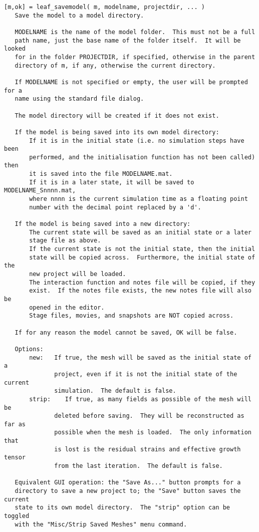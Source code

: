 \begin{verbatim}
[m,ok] = leaf_savemodel( m, modelname, projectdir, ... )
   Save the model to a model directory.

   MODELNAME is the name of the model folder.  This must not be a full
   path name, just the base name of the folder itself.  It will be looked
   for in the folder PROJECTDIR, if specified, otherwise in the parent
   directory of m, if any, otherwise the current directory.

   If MODELNAME is not specified or empty, the user will be prompted for a
   name using the standard file dialog.  

   The model directory will be created if it does not exist.

   If the model is being saved into its own model directory:
       If it is in the initial state (i.e. no simulation steps have been
       performed, and the initialisation function has not been called) then
       it is saved into the file MODELNAME.mat.
       If it is in a later state, it will be saved to MODELNAME_Snnnn.mat,
       where nnnn is the current simulation time as a floating point
       number with the decimal point replaced by a 'd'.

   If the model is being saved into a new directory:
       The current state will be saved as an initial state or a later
       stage file as above.
       If the current state is not the initial state, then the initial
       state will be copied across.  Furthermore, the initial state of the
       new project will be loaded.
       The interaction function and notes file will be copied, if they
       exist.  If the notes file exists, the new notes file will also be
       opened in the editor.
       Stage files, movies, and snapshots are NOT copied across.

   If for any reason the model cannot be saved, OK will be false.

   Options:
       new:   If true, the mesh will be saved as the initial state of a
              project, even if it is not the initial state of the current
              simulation.  The default is false.
       strip:    If true, as many fields as possible of the mesh will be
              deleted before saving.  They will be reconstructed as far as
              possible when the mesh is loaded.  The only information that
              is lost is the residual strains and effective growth tensor
              from the last iteration.  The default is false.

   Equivalent GUI operation: the "Save As..." button prompts for a
   directory to save a new project to; the "Save" button saves the current
   state to its own model directory.  The "strip" option can be toggled
   with the "Misc/Strip Saved Meshes" menu command.
\end{verbatim}

